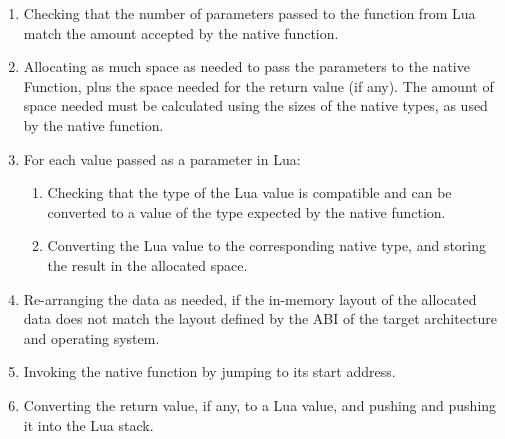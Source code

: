 \begin{enumerate}

	\item Checking that the number of parameters passed to the function from Lua
	match the amount accepted by the native function.

	\item Allocating as much space as needed to pass the parameters to
	the native Function, plus the space needed for the return value (if any).
	The amount of space needed must be calculated using the sizes of the native
	types, as used by the native function.

	\item For each value passed as a parameter in Lua:

		\begin{enumerate}

			\item Checking that the type of the Lua value is compatible and can be
			converted to a value of the type expected by the native function.

			\item Converting the Lua value to the corresponding native type, and
				storing the result in the allocated space.

		\end{enumerate}

	\item Re-arranging the data as needed, if the in-memory layout of the
		allocated data does not match the layout defined by the \gls{ABI} of the
		target architecture and operating system.

	\item Invoking the native function by jumping to its start address.

	\item Converting the return value, if any, to a Lua value, and pushing
		and pushing it into the Lua stack.

\end{enumerate}


